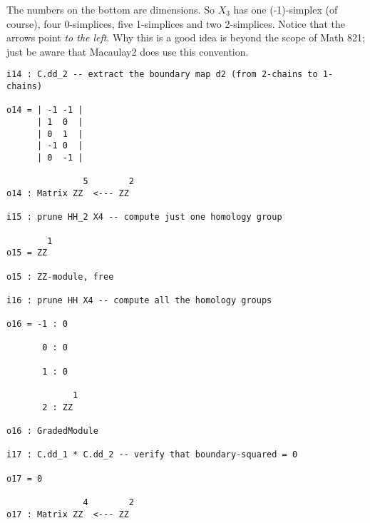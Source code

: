 The numbers on the bottom are dimensions.  So $X_3$ has one (-1)-simplex (of course),
four 0-simplices, five 1-simplices and two 2-simplices.  Notice that the arrows point \emph{to the left}.
Why this is a good idea is beyond the scope of Math 821; just be aware that Macaulay2 does use this convention.

\begin{framed}
\begin{verbatim}
i14 : C.dd_2 -- extract the boundary map d2 (from 2-chains to 1-chains)

o14 = | -1 -1 |
      | 1  0  |
      | 0  1  |
      | -1 0  |
      | 0  -1 |

               5        2
o14 : Matrix ZZ  <--- ZZ

i15 : prune HH_2 X4 -- compute just one homology group

        1
o15 = ZZ

o15 : ZZ-module, free

i16 : prune HH X4 -- compute all the homology groups

o16 = -1 : 0

       0 : 0

       1 : 0

             1
       2 : ZZ

o16 : GradedModule

i17 : C.dd_1 * C.dd_2 -- verify that boundary-squared = 0

o17 = 0

               4        2
o17 : Matrix ZZ  <--- ZZ
\end{verbatim}
\end{framed}

